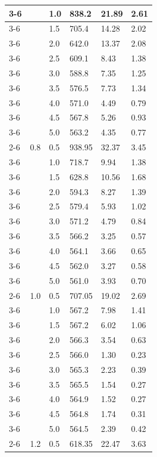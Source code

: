 \begin{longtable}{|p{}|p{}|p{}|p{}|p{}|p{}|}
	\cline{3-6}
	& & 1.0 & 838.2 & 21.89 & 2.61 \\
	\cline{3-6}
	& & 1.5 & 705.4 & 14.28 & 2.02 \\
	\cline{3-6}
	& & 2.0 & 642.0 & 13.37 & 2.08 \\
	\cline{3-6}
	& & 2.5 & 609.1 & 8.43 & 1.38 \\
	\cline{3-6}
	& & 3.0 & 588.8 & 7.35 & 1.25 \\
	\cline{3-6}
	& & 3.5 & 576.5 & 7.73 & 1.34 \\
	\cline{3-6}
	& & 4.0 & 571.0 & 4.49 & 0.79 \\
	\cline{3-6}
	& & 4.5 & 567.8 & 5.26 & 0.93 \\
	\cline{3-6}
	& & 5.0 & 563.2 & 4.35 & 0.77 \\
	\cline{2-6}
	& 0.8 & 0.5 & 938.95 & 32.37 & 3.45 \\
	\cline{3-6}
	& & 1.0 & 718.7 & 9.94 & 1.38 \\
	\cline{3-6}
	& & 1.5 & 628.8 & 10.56 & 1.68 \\
	\cline{3-6}
	& & 2.0 & 594.3 & 8.27 & 1.39 \\
	\cline{3-6}
	& & 2.5 & 579.4 & 5.93 & 1.02 \\
	\cline{3-6}
	& & 3.0 & 571.2 & 4.79 & 0.84 \\
	\cline{3-6}
	& & 3.5 & 566.2 & 3.25 & 0.57 \\
	\cline{3-6}
	& & 4.0 & 564.1 & 3.66 & 0.65 \\
	\cline{3-6}
	& & 4.5 & 562.0 & 3.27 & 0.58 \\
	\cline{3-6}
	& & 5.0 & 561.0 & 3.93 & 0.70 \\
	\cline{2-6}
	& 1.0 & 0.5 & 707.05 & 19.02 & 2.69 \\
	\cline{3-6}
	& & 1.0 & 567.2 & 7.98 & 1.41 \\
	\cline{3-6}
	& & 1.5 & 567.2 & 6.02 & 1.06 \\
	\cline{3-6}
	& & 2.0 & 566.3 & 3.54 & 0.63 \\
	\cline{3-6}
	& & 2.5 & 566.0 & 1.30 & 0.23 \\
	\cline{3-6}
	& & 3.0 & 565.3 & 2.23 & 0.39 \\
	\cline{3-6}
	& & 3.5 & 565.5 & 1.54 & 0.27 \\
	\cline{3-6}
	& & 4.0 & 564.9 & 1.52 & 0.27 \\
	\cline{3-6}
	& & 4.5 & 564.8 & 1.74 & 0.31 \\
	\cline{3-6}
	& & 5.0 & 564.5 & 2.39 & 0.42 \\
	\cline{2-6}
	& 1.2 & 0.5 & 618.35 & 22.47 & 3.63 \\

\end{longtable}
